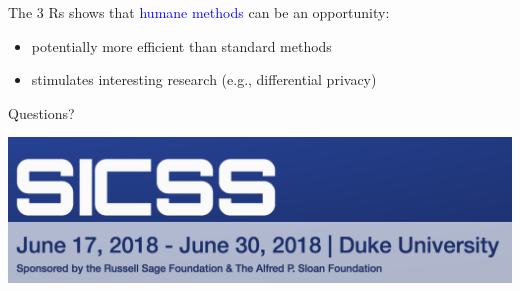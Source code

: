 \documentclass[aspectratio=169]{beamer}
\begin{document}
\begin{frame}

The 3 Rs shows that \textcolor{blue}{humane methods} can be an opportunity:
\pause
\begin{itemize}
\item potentially more efficient than standard methods
\pause
\item stimulates interesting research (e.g., differential privacy)
\end{itemize}

\end{frame}
\begin{frame}

\begin{center}
\LARGE Questions?  
\end{center}

\end{frame}
\begin{frame}

\begin{center}
\includegraphics[width=1.0\textwidth]{figures/sicss_logo}
\end{center}

\end{frame}
\end{document}
